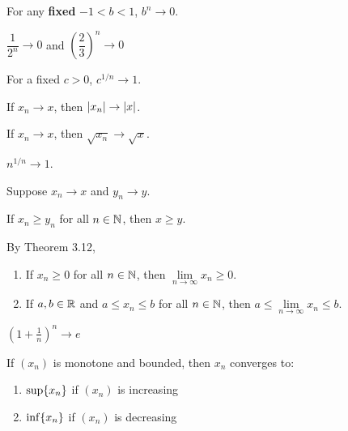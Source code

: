 \documentclass{article}
\begin{document}
\begin{theorem}
  For any \textbf{fixed} $-1 < b < 1$, $b^n \to 0$.
\end{theorem}

\begin{example}
  $\dfrac{1}{2^n} \to 0$ and $\left(\dfrac{2}{3}\right)^n \to 0$
\end{example}

\begin{theorem}
  For a fixed $c > 0$, $c^{1/n} \to 1$.
\end{theorem}

\begin{theorem}
  If $x_n \to x$, then $\abs{x_n} \to \abs{x}$.
\end{theorem}

\begin{theorem}
  If $x_n \to x$, then $\sqrt{x_n} \to \sqrt{x}$.
\end{theorem}

\begin{theorem}
  $n^{1/n} \to 1$.
\end{theorem}

\begin{theorem}
  Suppose $x_n \to x$ and $y_n \to y$.
  \item If $x_n \geq y_n$ for all $n \in \mathbb{N}$, then $x \geq y$.
\end{theorem}

\begin{corollary}
  By Theorem 3.12,
  \begin{enumerate}
    \item If $x_n \geq 0$ for all $n \in \mathbb{N}$, then $\lim\limits_{n \to \infty} x_n \geq 0$.
    \item If $a, b \in \mathbb{R}$ and $a \leq x_n \leq b$ for all $n \in \mathbb{N}$, then $a \leq \lim\limits_{n \to \infty} x_n \leq b$.
  \end{enumerate}
\end{corollary}

\begin{theorem}
  $\left( 1 + \frac{1}{n} \right)^n \to e$
\end{theorem}

\begin{theorem}
  If $(x_n)$ is monotone and bounded, then $x_n$ converges to:
  \begin{enumerate}
    \item $\sup \{x_n\}$ if $(x_n)$ is increasing
    \item $\inf \{x_n\}$ if $(x_n)$ is decreasing
  \end{enumerate}
\end{theorem}
\end{document}
